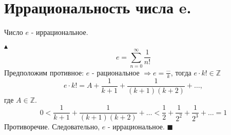 \setcounter{section}{70}
\section{Иррациональность числа e.}

\begin{theorem}
    Число $e$ - иррациональное.
\end{theorem}

$\blacktriangle$ $$e = \sum_{n = 0}^{\infty} \frac{1}{n!}$$
Предположим противное: $e$ - рациональное $ \Rightarrow e = \frac{\cdots}{k}$, тогда $e \cdot k! \in \mathbb{Z}$
$$e \cdot k! = A + \frac{1}{k+1} + \frac{1}{(k+1)(k+2)} + \ldots,$$
где $A \in \mathbb{Z}$. 
$$0 < \frac{1}{k+1} + \frac{1}{(k+1)(k+2)} + \ldots < \frac{1}{2} + \frac{1}{2^2} + \frac{1}{2^3} + \ldots = 1$$
Противоречие. Следовательно, $e$ - иррациональное. $\blacksquare$